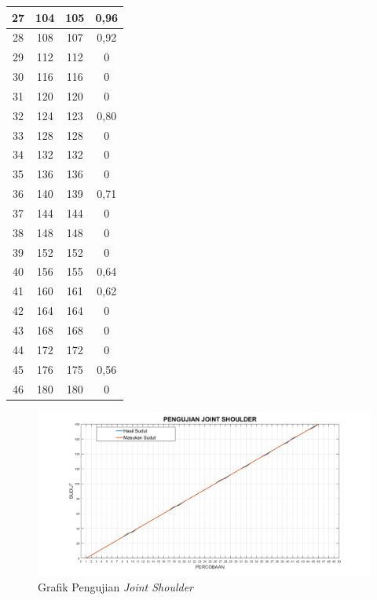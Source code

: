 \begin{longtable}{|c|c|c|c|}
	27 & 104     & 105      & 0,96 \\ \hline
	28 & 108     & 107      & 0,92 \\ \hline
	29 & 112     & 112      & 0           \\ \hline
	30 & 116     & 116      & 0           \\ \hline
	31 & 120     & 120      & 0           \\ \hline
	32 & 124     & 123      & 0,80 \\ \hline
	33 & 128     & 128      & 0           \\ \hline
	34 & 132     & 132      & 0           \\ \hline
	35 & 136     & 136      & 0           \\ \hline
	36 & 140     & 139      & 0,71 \\ \hline
	37 & 144     & 144      & 0           \\ \hline
	38 & 148     & 148      & 0           \\ \hline
	39 & 152     & 152      & 0           \\ \hline
	40 & 156     & 155      & 0,64 \\ \hline
	41 & 160     & 161      & 0,62       \\ \hline
	42 & 164     & 164      & 0           \\ \hline
	43 & 168     & 168      & 0           \\ \hline
	44 & 172     & 172      & 0           \\ \hline
	45 & 176     & 175      & 0,56 \\ \hline
	46 & 180     & 180      & 0           \\ \hline
\end{longtable}
\begin{figure}[H]
	\centering
	\includegraphics[width=13cm]{gambar/ps.png}
	\caption{Grafik Pengujian \textit{Joint Shoulder}}
	\label{pic.jointshoulder}
\end{figure}

